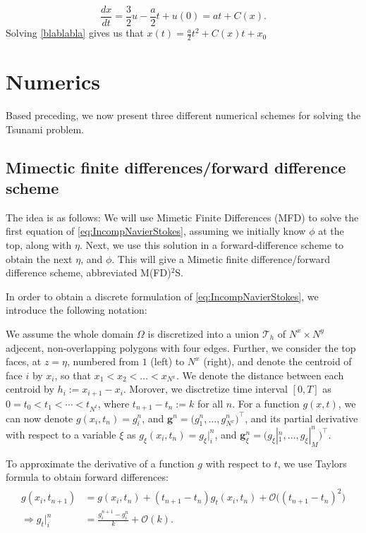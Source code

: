 \documentclass[11pt]{article}
\begin{document}
\begin{equation}
\label{blablabla}
\frac{d x}{d t} = \frac{3}{2}u - \frac{a}{2}t + u(0) = at + C(x).
\end{equation}
Solving \ref{blablabla} gives us that $x(t) = \frac{a}{2}t^2 + C(x) t + x_0$

%
%
\section{Numerics}

Based preceding, we now present three different numerical schemes for solving the Tsunami problem.
%
%
\subsection{Mimectic finite differences/forward difference scheme}

The idea is as follows: We will use Mimetic Finite Differences (MFD) \cite{raynaud15} to solve the first equation of \eqref{eq:IncompNavierStokes}, assuming we initially know
$\phi$ at the top, along with $\eta$. Next, we use this solution in a forward-difference scheme to obtain the next $\eta$, and $\phi$. This will give a Mimetic finite
difference/forward difference scheme, abbreviated M(FD)$^2$S.

In order to obtain a discrete formulation of \eqref{eq:IncompNavierStokes}, we introduce the following notation:

We assume the whole domain $\Omega$ is discretized into a union $\mathcal{T}_h$ of $N^x \times N^y$ adjecent, non-overlapping
polygons with four edges. Further, we consider the top faces, at $z = \eta$, numbered from $1$ (left) to $N^x$ (right), and denote
the centroid of face $i$ by $x_i$, so that $x_1 < x_2 < \dots < x_{N^x}$. We denote the distance between each centroid by
$h_i := x_{i+1}-x_i$. Morover, we disctretize time interval $[0, T]$ as $0 = t_0 < t_1 < \cdots < t_{N^t}$, where $t_{n+1}-t_n := k$ for all $n$.
For a function $g(x,t)$, we can now denote $g(x_i, t_n) = g_i^n$, and $\bm{g}^n = \Big(g_1^n, \dots, g_{N^x}^n\Big)^\top$, and its partial derivative with respect
to a variable $\xi$ as $g_\xi(x_i, t_n) = g_{\xi}|_i^n$, and $\bm{g}_\xi^n = \Big(g_{\xi}|_1^n, \dots, g_{\xi}|_M^n\Big)^\top$.

To approximate the derivative of a function $g$ with respect to $t$, we use Taylors formula to obtain forward differences:
\begin{align}
    \label{eq:ForwardDiff}
    \begin{aligned}
	    g(x_i, t_{n+1})       & = g(x_i, t_n) +  (t_{n+1}-t_n)g_t(x_i, t_n) + \mathcal{O}\big((t_{n+1}-t_n)^2\big) \\
	    \Rightarrow g_t|_i^n & = \frac{g_i^{n+1}-g_i^n}{k} + \mathcal{O}(k).
	\end{aligned}
\end{align}
\end{document}
